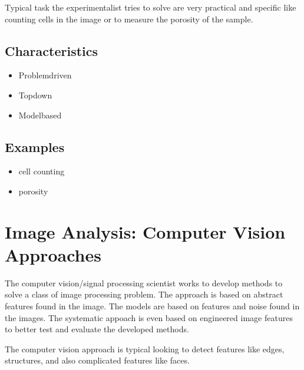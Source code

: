 \documentclass[letterpaper,10pt,english]{sphinxmanual}
\begin{document}
\sphinxAtStartPar
Typical task the experimentalist tries to solve are very practical and specific like counting cells in the image or to measure the porosity of the sample.




\subsection{Characteristics}
\label{\detokenize{01-Introduction:characteristics}}\begin{itemize}
\item {} 
\sphinxAtStartPar
Problem\sphinxhyphen{}driven

\item {} 
\sphinxAtStartPar
Top\sphinxhyphen{}down

\item {} 
\sphinxAtStartPar
{} Model\sphinxhyphen{}based

\end{itemize}


\subsection{Examples}
\label{\detokenize{01-Introduction:examples}}\begin{itemize}
\item {} 
\sphinxAtStartPar
cell counting

\item {} 
\sphinxAtStartPar
porosity

\end{itemize}




\section{Image Analysis: Computer Vision Approaches}
\label{\detokenize{01-Introduction:image-analysis-computer-vision-approaches}}
\sphinxAtStartPar
The computer vision/signal processing scientist works to develop methods to solve a class of image processing problem. The approach is based on abstract features found in the image. The models are based on features and noise found in the images. The systematic appoach is even based on engineered image features to better test and evaluate the developed methods.

\sphinxAtStartPar
The computer vision approach is typical looking to detect features like edges, structures, and also complicated features like faces.
\end{document}
